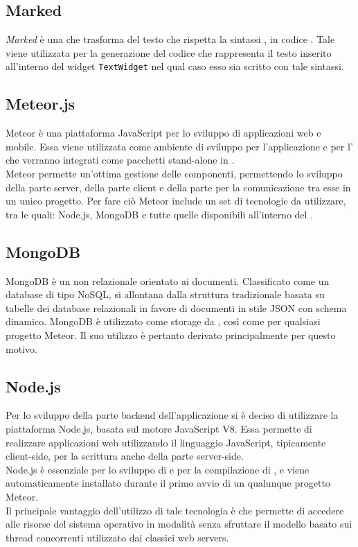 \subsection{Marked}
\textit{Marked} è una   che trasforma del testo che rispetta la sintassi , in codice . Tale  viene utilizzata per la generazione del codice  che rappresenta il testo inserito all'interno del widget \texttt{TextWidget} nel qual caso esso sia scritto con tale sintassi. 

\subsection{Meteor.js}
Meteor è una piattaforma JavaScript per lo sviluppo di applicazioni web e mobile. Essa viene utilizzata come ambiente di sviluppo per l'applicazione e per l' che verranno integrati come pacchetti stand-alone in . \\
Meteor permette un'ottima gestione delle componenti, permettendo lo sviluppo della parte server, della parte client e della parte per la comunicazione tra esse in un unico progetto. Per fare ciò Meteor include un set di tecnologie da utilizzare, tra le quali: Node.js, MongoDB e tutte quelle disponibili all'interno del  .

\subsection{MongoDB}
MongoDB è un  non relazionale orientato ai documenti. Classificato come un database di tipo NoSQL, si allontana dalla struttura tradizionale basata su tabelle dei database relazionali in favore di documenti in stile JSON con schema dinamico. MongoDB è utilizzato come storage da , così come per qualsiasi progetto Meteor. Il suo utilizzo è pertanto derivato principalmente per questo motivo.

\subsection{Node.js}
Per lo sviluppo della parte backend dell'applicazione si è deciso di utilizzare la piattaforma  Node.js, basata sul motore JavaScript V8. Essa permette di realizzare applicazioni web utilizzando il linguaggio JavaScript, tipicamente client-side, per la scrittura anche della parte server-side. \\
Node.js è essenziale per lo sviluppo di  e per la compilazione di , e viene automaticamente installato durante il primo avvio di un qualunque progetto Meteor. \\
Il principale vantaggio dell'utilizzo di tale tecnologia è che permette di accedere alle risorse del sistema operativo in modalità  senza sfruttare il modello basato sui thread concorrenti utilizzato dai classici web servers.

